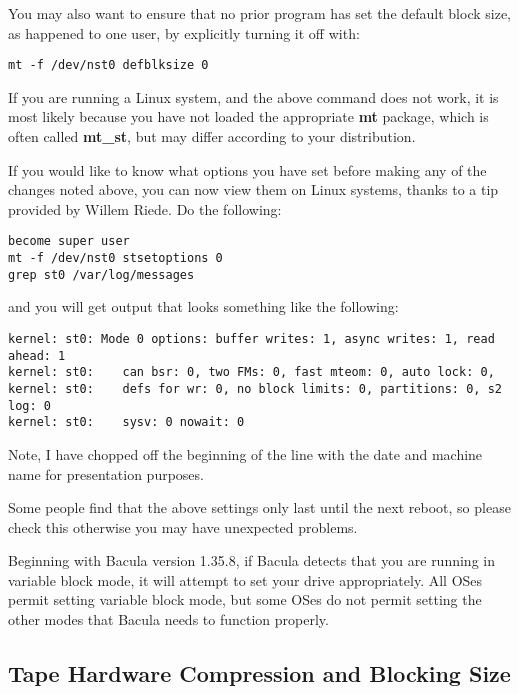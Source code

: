 You may also want to ensure that no prior program has set the default block
size, as happened to one user, by explicitly turning it off with: 

\footnotesize
\begin{verbatim}
mt -f /dev/nst0 defblksize 0
\end{verbatim}
\normalsize

If you are running a Linux
system, and the above command does not work, it is most likely because you
have not loaded the appropriate {\bf mt} package, which is often called
{\bf mt\_st}, but may differ according to your distribution.

If you would like to know what options you have set before making any of the
changes noted above, you can now view them on Linux systems, thanks to a tip
provided by Willem Riede. Do the following: 

\footnotesize
\begin{verbatim}
become super user
mt -f /dev/nst0 stsetoptions 0
grep st0 /var/log/messages
\end{verbatim}
\normalsize

and you will get output that looks something like the following: 

\footnotesize
\begin{verbatim}
kernel: st0: Mode 0 options: buffer writes: 1, async writes: 1, read ahead: 1
kernel: st0:    can bsr: 0, two FMs: 0, fast mteom: 0, auto lock: 0,
kernel: st0:    defs for wr: 0, no block limits: 0, partitions: 0, s2 log: 0
kernel: st0:    sysv: 0 nowait: 0
\end{verbatim}
\normalsize

Note, I have chopped off the beginning of the line with the date and machine
name for presentation purposes. 

Some people find that the above settings only last until the next reboot, so
please check this otherwise you may have unexpected problems. 

Beginning with Bacula version 1.35.8, if Bacula detects that you are running
in variable block mode, it will attempt to set your drive appropriately. All
OSes permit setting variable block mode, but some OSes do not permit setting
the other modes that Bacula needs to function properly. 

\label{compression}
\subsection{Tape Hardware Compression and Blocking Size}

